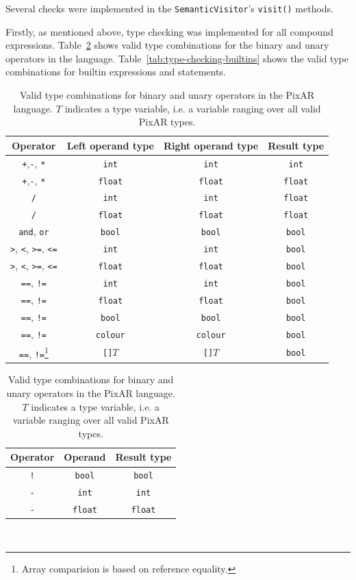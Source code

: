 \documentclass[11pt,a4paper]{scrartcl}
\begin{document}
Several checks were implemented in the \verb|SemanticVisitor|'s \verb|visit()| methods.

Firstly, as mentioned above, type checking was implemented for all compound expressions. Table~\ref{tab:type-checking-operators} shows valid type combinations for the binary and unary operators in the language. Table~\ref{tab:type-checking-builtins} shows the valid type combinations for builtin expressions and statements.

\begin{table}[ht]
  \centering
  \begin{tabular}{|c|c|c|c|}
    \hline
    Operator & Left operand type & Right operand type & Result type \\ \hline\hline
    \verb|+|,\verb|-|, \verb|*| & \Verb|int| & \Verb|int| & \Verb|int|\\ \hline
    \verb|+|,\verb|-|, \verb|*| & \Verb|float| & \Verb|float| & \Verb|float|\\ \hline
    \verb|/| & \Verb|int| & \Verb|int| & \Verb|float| \\ \hline
    \verb|/| & \Verb|float| & \Verb|float| & \Verb|float| \\ \hline
    \Verb|and|, \Verb|or| & \Verb|bool| & \Verb|bool| & \Verb|bool| \\ \hline
    \verb|>|, \verb|<|, \Verb|>=|, \Verb|<=| & \Verb|int| & \Verb|int| & \Verb|bool| \\ \hline
    \verb|>|, \verb|<|, \Verb|>=|, \Verb|<=| & \Verb|float| & \Verb|float| & \Verb|bool| \\ \hline
    \Verb|==|, \Verb|!=| & \Verb|int| & \Verb|int| & \Verb|bool| \\ \hline
    \Verb|==|, \Verb|!=| & \Verb|float| & \Verb|float| & \Verb|bool| \\ \hline
    \Verb|==|, \Verb|!=| & \Verb|bool| & \Verb|bool| & \Verb|bool| \\ \hline
    \Verb|==|, \Verb|!=| & \Verb|colour| & \Verb|colour| & \Verb|bool| \\ \hline
    \Verb|==|, \Verb|!=|\footnote{Array comparision is based on reference equality.} & \Verb|[]|$T$ & \Verb|[]|$T$ & \Verb|bool| \\ \hline
  \end{tabular}

  \begin{tabular}{|c|c|c|}
    \hline
    Operator & Operand & Result type \\ \hline\hline
    \Verb|!| & \Verb|bool| & \Verb|bool| \\ \hline
    \verb|-| & \Verb|int| & \Verb|int| \\ \hline
    \verb|-| & \Verb|float| & \Verb|float| \\ \hline
  \end{tabular}

  \caption{Valid type combinations for binary and unary operators in the PixAR language. $T$ indicates a type variable, i.e. a variable ranging over all valid PixAR types.}~\label{tab:type-checking-operators}
\end{table}
\end{document}
